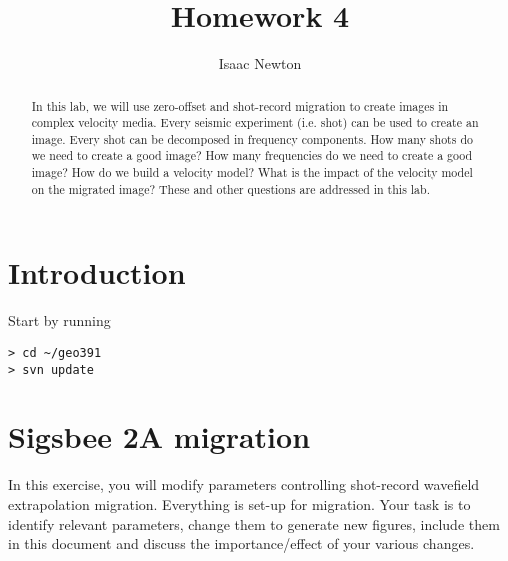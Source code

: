 \author{Isaac Newton}
\title{Homework 4}

\begin{abstract}
In this lab, we will use zero-offset and
shot-record migration to create 
images in complex velocity media.
%
Every seismic experiment (i.e. shot) can be used to create
an image. 
Every shot can be decomposed in frequency components. 
How many shots do we need to create a good image?
How many frequencies do we need to create a good image?
%
How do we build a velocity model?
What is the impact of the velocity model on the migrated image?
%
These and other questions are addressed in this lab.
\end{abstract}


\section{Introduction}

Start by running
\begin{verbatim}
> cd ~/geo391
> svn update
\end{verbatim}

\section{Sigsbee 2A migration}
In this exercise, you will modify parameters controlling 
shot-record wavefield extrapolation migration.
Everything is set-up for migration. Your task is to
identify relevant parameters, change them to generate 
new figures, include them in this document and discuss
the importance/effect of your various changes.


